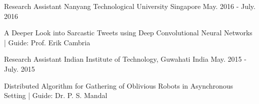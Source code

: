 

\begin{cventries}

  \cventry
    {Research Assistant} %
    {Nanyang Technological University} %
    {Singapore} %
    {May. 2016 - July. 2016} %
    {
      \begin{cvitems} %
        \item {A Deeper Look into Sarcastic Tweets using Deep Convolutional Neural Networks | Guide: Prof. Erik Cambria}
      \end{cvitems}
    }

  \cventry
    {Research Assistant} %
    {Indian Institute of Technology, Guwahati} %
    {India} %
    {May. 2015 - July. 2015} %
    {
      \begin{cvitems} %
        \item {Distributed Algorithm for Gathering of Oblivious Robots in Asynchronous Setting | Guide: Dr. P. S. Mandal}
      \end{cvitems}
    }
\end{cventries}
